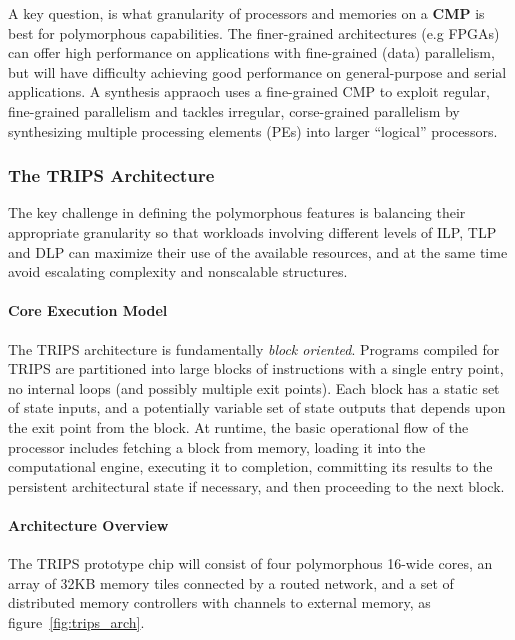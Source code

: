 \documentclass[UTF8,12pt,a4paper]{article}
\begin{document}
A key question, is what granularity of processors and memories
on a \textbf{CMP} is best for polymorphous capabilities.
The finer-grained architectures (e.g FPGAs) can offer high performance
on applications with fine-grained (data) parallelism,
but will have difficulty achieving good performance on general-purpose and serial applications.
A synthesis appraoch uses a fine-grained CMP to exploit regular, fine-grained parallelism
and tackles irregular, corse-grained parallelism by
synthesizing multiple processing elements (PEs) into larger ``logical'' processors.

\subsubsection{The TRIPS Architecture}
The key challenge in defining the polymorphous features
is balancing their appropriate granularity so that
workloads involving different levels of ILP, TLP and DLP
can maximize their use of the available resources,
and at the same time avoid escalating complexity and nonscalable structures.

\paragraph{Core Execution Model}
The TRIPS architecture is fundamentally \emph{block oriented}.
Programs compiled for TRIPS are partitioned into large blocks of instructions
with a single entry point, no internal loops (and possibly multiple exit points).
Each block has a static set of state inputs, and
a potentially variable set of state outputs that depends upon
the exit point from the block.
At runtime, the basic operational flow of the processor includes fetching a block from memory,
loading it into the computational engine, executing it to completion,
committing its results to the persistent architectural state if necessary,
and then proceeding to the next block.

\paragraph{Architecture Overview}
The TRIPS prototype chip will consist of four polymorphous 16-wide cores,
an array of 32KB memory tiles connected by a routed network,
and a set of distributed memory controllers with channels to external memory,
as figure~\ref{fig:trips_arch}.
\end{document}
